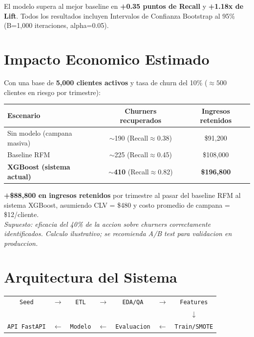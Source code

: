 \documentclass[11pt,a4paper]{article}
\newcommand{\successbox}[2]{%
  \begin{tcolorbox}[colback=green!8!white,colframe=success,
    title={\bfseries\color{success}#1},
    left=6pt, right=6pt, top=4pt, bottom=4pt, boxrule=0.8pt, arc=4pt]
    #2
  \end{tcolorbox}%
}
\begin{document}
\vspace{0.4cm}

El modelo supera al mejor baseline en \textbf{+0.35 puntos de Recall} y
\textbf{+1.18x de Lift}. Todos los resultados incluyen Intervalos de Confianza
Bootstrap al 95\% (B=1{,}000 iteraciones, alpha=0.05).

\section{Impacto Economico Estimado}

Con una base de \textbf{5{,}000 clientes activos} y tasa de churn del 10\%
($\approx 500$ clientes en riesgo por trimestre):

\vspace{0.3cm}
\renewcommand{\arraystretch}{1.4}
\begin{tabularx}{\linewidth}{L{5.4cm}cc}
  \toprule
  \textbf{Escenario} & \textbf{Churners recuperados} & \textbf{Ingresos retenidos} \\
  \midrule
  Sin modelo (campana masiva)           & $\sim$190 (Recall$\approx$0.38) & \$91{,}200  \\
  Baseline RFM                          & $\sim$225 (Recall$\approx$0.45) & \$108{,}000 \\
  \textbf{XGBoost (sistema actual)}     & $\sim$\textbf{410} (Recall$\approx$0.82) & \textbf{\$196{,}800} \\
  \bottomrule
\end{tabularx}

\vspace{0.4cm}

\successbox{Beneficio Neto Estimado vs.\ Baseline RFM}{%
  \textbf{+\$88{,}800 en ingresos retenidos} por trimestre al pasar del baseline RFM al
  sistema XGBoost, asumiendo CLV = \$480 y costo promedio de campana = \$12/cliente.\\[4pt]
  \textit{Supuesto: eficacia del 40\% de la accion sobre churners correctamente
  identificados. Calculo ilustrativo; se recomienda A/B test para validacion en produccion.}
}

\section{Arquitectura del Sistema}

\begin{center}
\small
\begin{tabular}{ccccccc}
  \texttt{Seed} & $\rightarrow$ & \texttt{ETL} & $\rightarrow$ & \texttt{EDA/QA} & $\rightarrow$ & \texttt{Features} \\[4pt]
  & & & & & & $\downarrow$ \\[4pt]
  \texttt{API FastAPI} & $\leftarrow$ & \texttt{Modelo} & $\leftarrow$ & \texttt{Evaluacion} & $\leftarrow$ & \texttt{Train/SMOTE} \\
\end{tabular}
\end{center}
\end{document}
